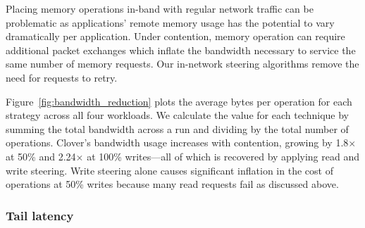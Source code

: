 Placing memory operations in-band with regular network traffic can be
problematic as applications' remote memory usage has the potential to
vary dramatically per application.  Under contention, memory operation
can require additional packet exchanges which inflate the bandwidth
necessary to service the same number of memory requests. Our
in-network steering algorithms remove the need for requests to
retry.



Figure~\ref{fig:bandwidth_reduction} plots the average bytes per
operation for each strategy across all four workloads. We
calculate the value for each technique by summing the total bandwidth
across a run and dividing by the total number of operations. Clover's
bandwidth usage increases with contention, growing by 1.8$\times$ at
50\% and 2.24$\times$ at 100\% writes---all of which is recovered by
applying read and write steering. Write steering alone causes
significant inflation in the cost of operations at 50\% writes because many
read requests fail as discussed above.

\subsubsection{Tail latency}


